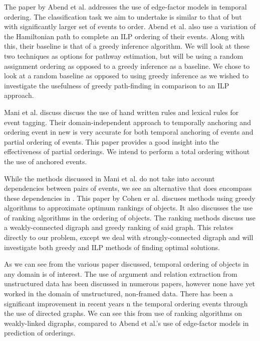 \documentclass[bsc,frontabs,twoside,singlespacing,parskip,deptreport]{infthesis}     %
\begin{document}
The paper by  Abend et al. \cite{abend2015lexical} addresses the use of
edge-factor models in temporal ordering. The classification task we aim to undertake is similar to that of \cite{abend2015lexical}
but with significantly larger set of events to order.
Abend et al.\cite{abend2015lexical} also use a variation of the Hamiltonian path
to complete an ILP ordering of their events. Along with this, their baseline is that of a greedy inference algorithm.
We will look at these two techniques as options for pathway estimation, but will be using a random assignment ordering as
opposed to a greedy inference as a baseline. We chose to look at a random baseline as opposed to using greedy inference as
we wished to investigate the usefulness of greedy path-finding in comparison to an ILP approach.

Mani et al.\cite{mani2006machine} discuss discuss the use of hand written rules and lexical rules for event tagging.
Their domain-independent approach to temporally anchoring and ordering event in new is very accurate for both temporal
anchoring of events and partial ordering of events. This paper provides a good insight into the effectiveness of
partial orderings. We intend to perform a total ordering without the use of anchored events.

While the methods discussed in Mani et al. \cite{mani2006machine} do not take into account dependencies between pairs of events, 
we see an alternative that does encompass
these dependencies in \cite{schapire1998learning}.
This paper by Cohen er al. discuses methods using greedy algorithms to approximate optimum rankings of objects.
It also discusses the use of ranking algorithms in the ordering of objects. The ranking methods discuss use a
weakly-connected digraph and greedy ranking of said graph. This relates directly to our problem,
except we deal with strongly-connected digraph and will investigate both greedy and ILP methods of finding
optimal solutions.


As we can see from the various paper discussed, temporal ordering of objects in any domain is of interest.
The use of argument and relation extraction from unstructured data has been discussed in numerous papers,
however none have yet worked in the domain of unstructured, non-framed data.
There has been a significant improvement in recent years n the temporal ordering events through the use of
directed graphs. We can see this from \cite{schapire1998learning} use of ranking algorithms on weakly-linked
digraphs, compared to Abend et al.'s \cite{abend2015lexical} use of edge-factor models in prediction of orderings. 
\end{document}
